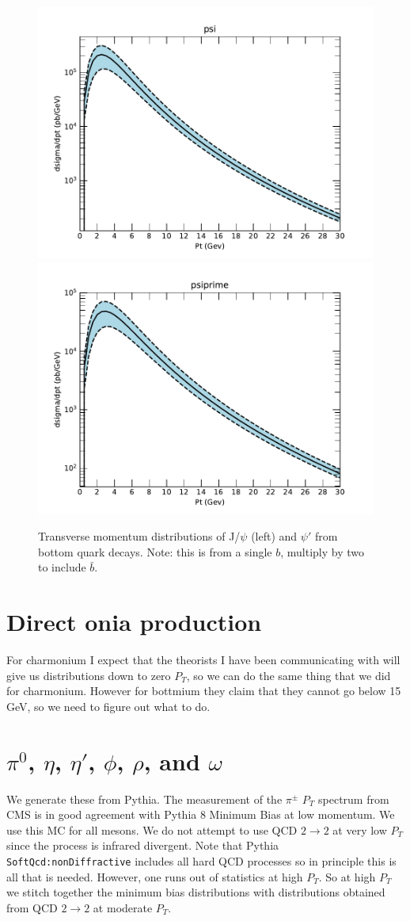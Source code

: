 \documentclass[12pt]{article}
\begin{document}
\begin{figure}
  \includegraphics[width=0.48\linewidth]{../oniaFromB/psi.pdf}
  \includegraphics[width=0.48\linewidth]{../oniaFromB/psiprime.pdf}
  \caption{Transverse momentum distributions of J/$\psi$ (left) 
and $\psi'$ from bottom quark decays. Note: this is from a single $b$, 
multiply by two to include $\bar{b}$.}
  \label{fig:bpsi}
\end{figure}

\section{Direct onia production}
\label{sec:onia}

\noindent For charmonium I expect that the theorists I have been
communicating with
will give us distributions down to zero $P_T$, so we can do the same
thing that we did for charmonium.  However for bottmium they claim
that they cannot go below 15 GeV, so we need to figure out what to do.


\section{$\pi^0$, $\eta$, $\eta'$, $\phi$, $\rho$, and $\omega$}
\label{sec:mesons}

We generate these from Pythia.  The measurement of the 
$\pi^{\pm}$
$P_T$ spectrum from CMS\cite{Sirunyan:2017zmn} is in good agreement
with Pythia 8 Minimum Bias at low momentum.  We use this MC for all
mesons.  We do not attempt to use QCD $2 \to 2$ at very low $P_T$ since the 
process is infrared divergent.
Note that Pythia {\tt SoftQcd:nonDiffractive} includes all
hard QCD processes\cite{wwwPythia} so in principle this is all that is
needed.    However, one runs out of statistics at high $P_T$.  So 
at high $P_T$ we stitch together the minimum bias distributions with 
distributions obtained from QCD $2 \to 2$ at moderate $P_T$.
\end{document}
